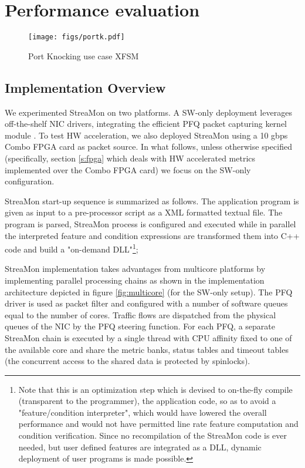 \documentclass[conference,letterpaper]{sig-alternate-10pt}
\begin{document}
\section{Performance evaluation}




\begin{figure}[t]
	\centering
	\texttt{[image: figs/portk.pdf]}
	\vspace*{-.5cm}
	\caption{Port Knocking use case XFSM}
	\vspace*{-.5cm}
	\label{fig:portkn}
\end{figure}

\subsection{Implementation Overview}


We experimented StreaMon on two platforms. A SW-only deployment leverages off-the-shelf NIC drivers, integrating the efficient PFQ packet capturing kernel module \cite{pfq}. To test HW acceleration, we also deployed StreaMon using a 10 gbps Combo FPGA card as packet source. In what follows, unless otherwise specified (specifically, section \ref{s:fpga} which deals with HW accelerated metrics implemented over the Combo FPGA card) we focus on the SW-only configuration.

StreaMon start-up sequence is summarized as follows. The application program is given as input to a pre-processor script as a XML formatted textual file. The program is parsed, StreaMon process is configured and executed while in parallel the interpreted feature and condition expressions are transformed them into C++ code and build a "on-demand DLL"\footnote{
	Note that this is an optimization step which is devised to on-the-fly compile (transparent to the 
	programmer), the application code, so as to avoid a "feature/condition interpreter", which would 
	have lowered the overall performance and would not have permitted line rate feature computation 
	and condition verification. Since no recompilation of the StreaMon code is ever needed, but user 
	defined features are integrated as a DLL, dynamic deployment of user programs is made possible.
}; 



StreaMon implementation takes advantages from multicore platforms by implementing parallel processing chains as shown in the implementation architecture depicted in figure \ref{fig:multicore} (for the SW-only setup). The PFQ driver is used as packet filter and configured with a number of software queues equal to the number of cores. Traffic flows are dispatched from the physical queues of the NIC by the PFQ steering function. For each PFQ, a separate StreaMon chain is executed by a single thread with CPU affinity fixed to one of the available core and share the metric banks, status tables and timeout tables (the concurrent access to the shared data is protected by spinlocks).  
\end{document}
